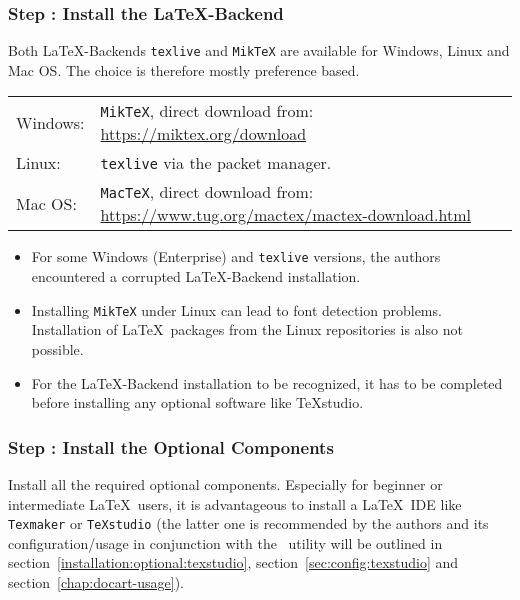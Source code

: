 		\subsubsection{Step \thestep: Install the \LaTeX-Backend}
			Both \LaTeX-Backends \lstinline{texlive} and \lstinline{MikTeX} are available for Windows, Linux and Mac OS. The choice is therefore mostly preference based. 
			\begin{longtable}[c]{ll}
				\rowcolor{white}
				\multicolumn{2}{l}{\textbf{Recommendation:}}\\
				\midrule
				\endfirsthead
				Windows: & \lstinline$MikTeX$, direct download from: \href{https://miktex.org/download}{https://miktex.org/download}\\
				Linux: & \lstinline$texlive$ via the packet manager. \\
				Mac OS: & \lstinline$MacTeX$, direct download from: \href{https://www.tug.org/mactex/mactex-download.html}{https://www.tug.org/mactex/mactex-download.html}\\
				\midrule
			\end{longtable}
			
			\begin{daWarningBox}
				\begin{itemize}[leftmargin=*]
					\setlength\itemsep{-0.1em}
					\item For some Windows (Enterprise) and \lstinline{texlive} versions, the authors encountered a corrupted \LaTeX-Backend installation. %
					\item  Installing \lstinline{MikTeX} under Linux can lead to font detection problems. Installation of \LaTeX~packages from the Linux repositories is also not possible.
					\item For the \LaTeX-Backend installation to be recognized, it has to be completed before installing any optional software like TeXstudio.
				\end{itemize}
			\end{daWarningBox}
			
			
			
		\newpage
		\subsubsection{Step \thestep: Install the Optional Components}
			Install all the required optional components. Especially for beginner or intermediate \LaTeX~users, it is advantageous to install a \LaTeX~IDE like \lstinline{Texmaker} or \lstinline{TeXstudio} (the latter one is recommended by the authors and its configuration/usage in conjunction with the \productName~utility will be outlined in \mbox{section \ref{installation:optional:texstudio}}, \mbox{section \ref{sec:config:texstudio}} and \mbox{section \ref{chap:docart-usage}}). 
			
